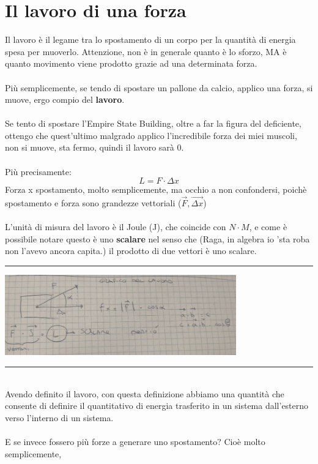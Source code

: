 \documentclass[12pt, a4paper, openany, oneside]{book}
\begin{document}
\section{Il lavoro di una forza}
Il lavoro è il legame tra lo spostamento di un corpo per la quantità di energia
spesa per muoverlo. Attenzione, non è in generale quanto è lo sforzo, MA è quanto
movimento viene prodotto grazie ad una determinata forza. \\ \\
Più semplicemente, se tendo di spostare un pallone da calcio, applico una forza,
si muove, ergo compio del \textbf{lavoro}. \\ \\
Se tento di spostare l'Empire State Building, oltre a far la figura del deficiente,
ottengo che quest'ultimo malgrado applico l'incredibile forza dei miei muscoli,
non si muove, sta fermo, quindi il lavoro sarà 0.
\\  \\
Più precisamente:
\[L = F \cdot \Delta x\]
Forza x spostamento, molto semplicemente, ma occhio a non confondersi, poichè
spostamento e forza sono grandezze vettoriali ($\overrightarrow{F}, 
\overrightarrow{\Delta x}$)
\\ \\
L'unità di misura del lavoro è il Joule (J), che coincide con $N\cdot M$, e come
è possibile notare questo è uno \textbf{scalare} nel senso che (Raga, in algebra
io 'sta roba non l'avevo ancora capita.) il prodotto di due vettori è uno scalare.
\\
{\color{black} \rule{\linewidth}{0.3mm} }
\begin{center}
\includegraphics[width=0.75\textwidth]{graficoLavoro}
\end{center}
{\color{black} \rule{\linewidth}{0.3mm} }
\\
Avendo definito il lavoro, con questa definizione abbiamo una quantità che 
consente di definire il quantitativo di energia trasferito in un sistema
dall'esterno verso l'interno di un sistema. \\ \\
E se invece fossero più forze a generare uno spostamento? Cioè molto semplicemente,
\end{document}
